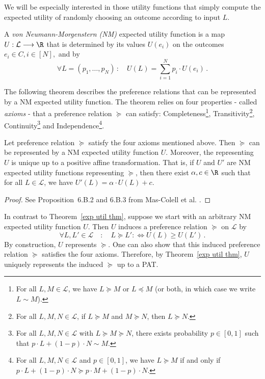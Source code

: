 We will be especially interested in those utility functions that simply compute the expected utility of randomly choosing an outcome according to input $L$.
\begin{defn*}
    A \textit{von Neumann-Morgenstern (NM)} expected utility function is a map $U : \mathcal{L} \longrightarrow \R$ that is determined by its values $U(e_i)$ on the outcomes $e_i \in C, i \in [N],$ and by 
    \[\forall L = (p_1,\ldots,p_N) \,: \quad U(L) = \sum_{i = 1}^N p_i \cdot U(e_i) \, .\]
\end{defn*}

The following theorem describes the preference relations that can be represented by a NM expected utility function. The theorem relies on four properties - called \textit{axioms} - that a preference relation $\succeq$ can satisfy: Completeness\footnote{For all $L,M \in \mathcal{L}$, we have $L \succeq M$ or $L \preceq M$ (or both, in which case we write $L \sim M$).}, Transitivity\footnote{For all $L,M,N \in \mathcal{L}$, if $L \succeq M$ and $M \succeq N$, then $L \succeq N$.}, Continuity\footnote{For all $L,M,N \in \mathcal{L}$ with $L \succeq M \succeq N$, there exists probability $p \in [0,1]$ such that $p \cdot L + (1-p) \cdot N \sim M$.} and Independence\footnote{For all $L,M,N \in \mathcal{L}$ and $p \in [0,1]$, we have $L \succeq M$ if and only if $p \cdot L + (1-p) \cdot N \succeq p \cdot M + (1-p) \cdot N$.}.
\begin{thm}
\label{exp util thm}
Let preference relation $\succeq$ satisfy the four axioms mentioned above. Then $\succeq$ can be represented by a NM expected utility function $U$. Moreover, the representing $U$ is unique up to a positive affine transformation. That is, if $U$ and $U'$ are NM expected utility functions representing $\succeq$, then there exist $\alpha,c \in \R$ such that for all $L \in \mathcal{L}$, we have $U'(L) = \alpha \cdot U(L) + c$.
\end{thm}
\begin{proof}
See Proposition~6.B.2 and 6.B.3 from Mas-Colell et al. \cite{MasCol}.
\end{proof}
In contrast to Theorem~\ref{exp util thm}, suppose we start with an arbitrary NM expected utility function $U$. Then $U$ induces a preference relation $\succeq$ on $\mathcal{L}$ by 
\[ \forall L, L' \in \mathcal{L} \quad :  \quad L \succeq L' :\iff U(L) \geq U(L') \, . \] 
By construction, $U$ represents $\succeq$. One can also show that this induced preference relation $\succeq$ satisfies the four axioms. Therefore, by Theorem~\ref{exp util thm}, $U$ uniquely represents the induced $\succeq$ up to a PAT.

